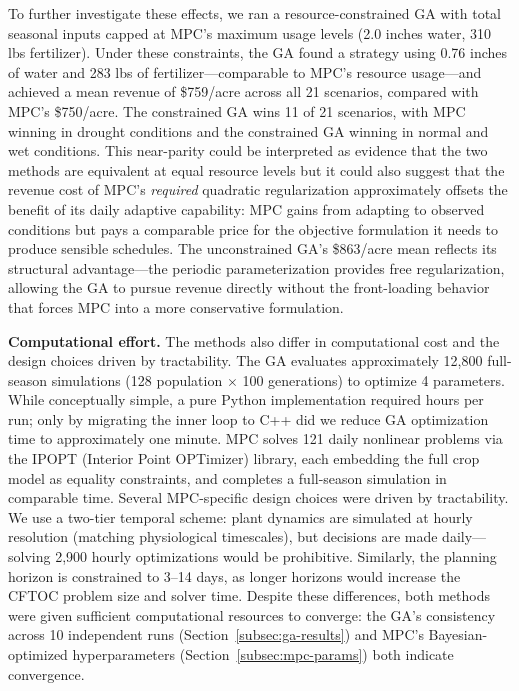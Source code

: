 \documentclass[pdflatex,sn-mathphys-num]{sn-jnl}
\begin{document}
To further investigate these effects, we ran a resource-constrained GA with total seasonal inputs capped at MPC's maximum usage levels (2.0 inches water, 310 lbs fertilizer). Under these constraints, the GA found a strategy using 0.76 inches of water and 283 lbs of fertilizer---comparable to MPC's resource usage---and achieved a mean revenue of \$759/acre across all 21 scenarios, compared with MPC's \$750/acre. The constrained GA wins 11 of 21 scenarios, with MPC winning in drought conditions and the constrained GA winning in normal and wet conditions. This near-parity could be interpreted as evidence that the two methods are equivalent at equal resource levels but it could also suggest that the revenue cost of MPC's \emph{required} quadratic regularization approximately offsets the benefit of its daily adaptive capability: MPC gains from adapting to observed conditions but pays a comparable price for the objective formulation it needs to produce sensible schedules. The unconstrained GA's \$863/acre mean reflects its structural advantage---the periodic parameterization provides free regularization, allowing the GA to pursue revenue directly without the front-loading behavior that forces MPC into a more conservative formulation.

\textbf{Computational effort.} The methods also differ in computational cost and the design choices driven by tractability. The GA evaluates approximately 12,800 full-season simulations (128 population $\times$ 100 generations) to optimize 4 parameters. While conceptually simple, a pure Python implementation required hours per run; only by migrating the inner loop to C++ did we reduce GA optimization time to approximately one minute. MPC solves 121 daily nonlinear problems via the IPOPT (Interior Point OPTimizer) library, each embedding the full crop model as equality constraints, and completes a full-season simulation in comparable time. Several MPC-specific design choices were driven by tractability. We use a two-tier temporal scheme: plant dynamics are simulated at hourly resolution (matching physiological timescales), but decisions are made daily---solving 2,900 hourly optimizations would be prohibitive. Similarly, the planning horizon is constrained to 3--14 days, as longer horizons would increase the CFTOC problem size and solver time. Despite these differences, both methods were given sufficient computational resources to converge: the GA's consistency across 10 independent runs (Section~\ref{subsec:ga-results}) and MPC's Bayesian-optimized hyperparameters (Section~\ref{subsec:mpc-params}) both indicate convergence.
\end{document}
